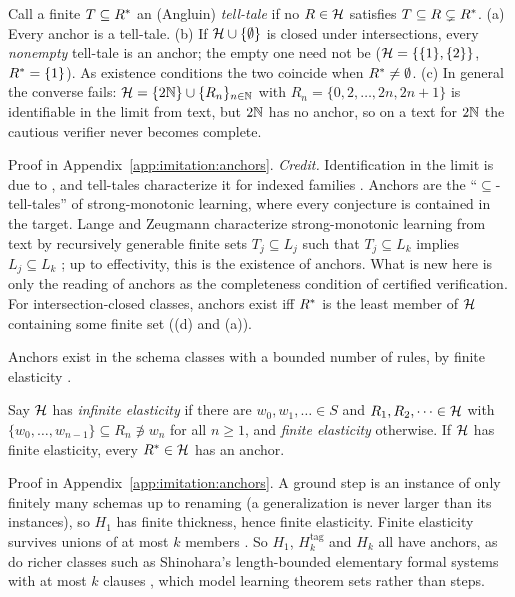 \begin{proposition}\label{prop:imitation:telltale}
Call a finite $T\subseteq R^{*}$ an (Angluin) \emph{tell-tale} if no $R\in\mathcal{H}$ satisfies $T\subseteq R\subsetneq R^{*}$.
\textup{(a)} Every anchor is a tell-tale.
\textup{(b)} If $\mathcal{H}\cup\{\emptyset\}$ is closed under intersections, every \emph{nonempty} tell-tale is an anchor; the empty one need not be ($\mathcal{H}=\{\{1\},\{2\}\}$, $R^{*}=\{1\}$). As existence conditions the two coincide when $R^{*}\neq\emptyset$.
\textup{(c)} In general the converse fails: $\mathcal{H}=\{2\mathbb{N}\}\cup\{R_n\}_{n\in\mathbb{N}}$ with $R_n=\{0,2,\dots,2n,2n+1\}$ is identifiable in the limit from text, but $2\mathbb{N}$ has no anchor, so on a text for $2\mathbb{N}$ the cautious verifier never becomes complete.
\end{proposition}

Proof in Appendix~\ref{app:imitation:anchors}. \emph{Credit.} Identification in the limit is due to \citet{gold1967language}, and tell-tales characterize it for indexed families \citep{angluin1980inductive}. Anchors are the ``$\subseteq$-tell-tales'' of strong-monotonic learning, where every conjecture is contained in the target. Lange and Zeugmann characterize strong-monotonic learning from text by recursively generable finite sets $T_j\subseteq L_j$ such that $T_j\subseteq L_k$ implies $L_j\subseteq L_k$ \citep[cf.][]{lange1992types,lange2008learning}; up to effectivity, this is the existence of anchors. What is new here is only the reading of anchors as the completeness condition of certified verification. For intersection-closed classes, anchors exist iff $R^{*}$ is the least member of $\mathcal{H}$ containing some finite set ((d) and (a)).

Anchors exist in the schema classes with a bounded number of rules, by finite elasticity \citep{wright1989identification,motoki1991correct}.

\begin{proposition}\label{prop:imitation:elastic}
Say $\mathcal{H}$ has \emph{infinite elasticity} if there are $w_0,w_1,\dots\in S$ and $R_1,R_2,\dots\in\mathcal{H}$ with $\{w_0,\dots,w_{n-1}\}\subseteq R_n\not\ni w_n$ for all $n\ge1$, and \emph{finite elasticity} otherwise. If $\mathcal{H}$ has finite elasticity, every $R^{*}\in\mathcal{H}$ has an anchor.
\end{proposition}

Proof in Appendix~\ref{app:imitation:anchors}. A ground step is an instance of only finitely many schemas up to renaming (a generalization is never larger than its instances), so $H_1$ has finite thickness, hence finite elasticity. Finite elasticity survives unions of at most $k$ members \citep[as corrected by \citealt{motoki1991correct}]{wright1989identification}. So $H_1$, $H^{\mathrm{tag}}_k$ and $H_k$ all have anchors, as do richer classes such as Shinohara's length-bounded elementary formal systems with at most $k$ clauses \citep{shinohara1994rich}, which model learning theorem sets rather than steps.

